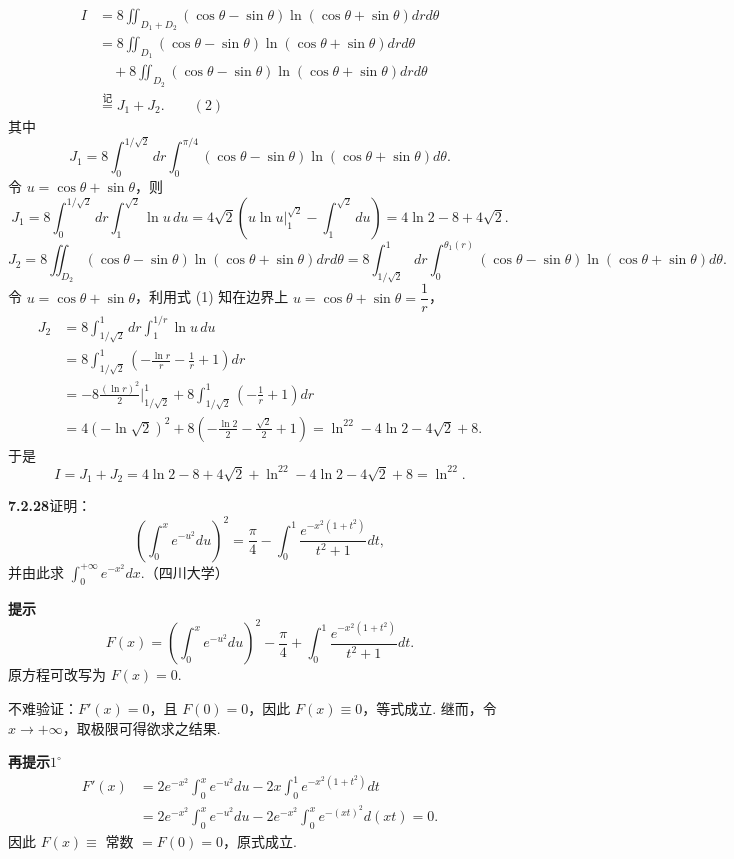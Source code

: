 \documentclass[UTF8, 12pt, fontset=fandol, oneside]{ctexart}
\begin{document}
\[
\begin{aligned}
I&=8\iint_{D_1+D_2}(\cos\theta-\sin\theta)\ln(\cos\theta+\sin\theta)drd\theta\\
&=8\iint_{D_1}(\cos\theta-\sin\theta)\ln(\cos\theta+\sin\theta)drd\theta\\
&\quad+8\iint_{D_2}(\cos\theta-\sin\theta)\ln(\cos\theta+\sin\theta)drd\theta\\
&\overset{\text{记}}=J_1+J_2. \qquad (2)
\end{aligned}
\]
其中
\[
J_1=8\int_0^{1/\sqrt2}dr\int_0^{\pi/4}
(\cos\theta-\sin\theta)\ln(\cos\theta+\sin\theta)d\theta.
\]
令 $u=\cos\theta+\sin\theta$，则
\[
J_1=8\int_0^{1/\sqrt2}dr\int_1^{\sqrt2}\ln u\,du
=4\sqrt2\left(u\ln u\Big|_1^{\sqrt2}-\int_1^{\sqrt2}du\right)
=4\ln2-8+4\sqrt2.
\]
\[
J_2=8\iint_{D_2}(\cos\theta-\sin\theta)\ln(\cos\theta+\sin\theta)drd\theta
=8\int_{1/\sqrt2}^1dr\int_0^{\theta_1(r)}
(\cos\theta-\sin\theta)\ln(\cos\theta+\sin\theta)d\theta.
\]
令 $u=\cos\theta+\sin\theta$，利用式 (1) 知在边界上 $u=\cos\theta+\sin\theta=\dfrac1r$，
\[
\begin{aligned}
J_2&=8\int_{1/\sqrt2}^1dr\int_1^{1/r}\ln u\,du\\
&=8\int_{1/\sqrt2}^1\left(-\frac{\ln r}{r}-\frac1r+1\right)dr\\
&=-8\frac{(\ln r)^2}{2}\Big|_{1/\sqrt2}^1
+8\int_{1/\sqrt2}^1\left(-\frac1r+1\right)dr\\
&=4(-\ln\sqrt2)^2+8\left(-\frac{\ln2}{2}-\frac{\sqrt2}{2}+1\right)
=\ln^22-4\ln2-4\sqrt2+8.
\end{aligned}
\]
于是
\[
I=J_1+J_2
=4\ln2-8+4\sqrt2+\ln^22-4\ln2-4\sqrt2+8
=\ln^22.
\]

\noindent\textbf{7.2.28}\quad 证明：
\[
\left(\int_0^xe^{-u^2}du\right)^2
=\frac\pi4-\int_0^1\frac{e^{-x^2(1+t^2)}}{t^2+1}dt,
\]
并由此求 $\displaystyle\int_0^{+\infty}e^{-x^2}dx$.（四川大学）

\noindent\textbf{提示}\quad
\[
F(x)=\left(\int_0^xe^{-u^2}du\right)^2-\frac\pi4
+\int_0^1\frac{e^{-x^2(1+t^2)}}{t^2+1}dt.
\]
原方程可改写为 $F(x)=0$.

不难验证：$F'(x)=0$，且 $F(0)=0$，因此 $F(x)\equiv0$，等式成立. 继而，令 $x\to+\infty$，取极限可得欲求之结果.

\noindent\textbf{再提示}\quad $1^\circ$
\[
\begin{aligned}
F'(x)
&=2e^{-x^2}\int_0^xe^{-u^2}du
-2x\int_0^1e^{-x^2(1+t^2)}dt\\
&=2e^{-x^2}\int_0^xe^{-u^2}du
-2e^{-x^2}\int_0^xe^{-(xt)^2}d(xt)=0.
\end{aligned}
\]
因此 $F(x)\equiv$ 常数 $=F(0)=0$，原式成立.
\end{document}
